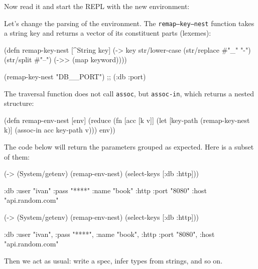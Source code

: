 
\noindent
Now read it and start the REPL with the new environment:


Let's change the parsing of the environment. The \texttt{remap--key--nest} function takes a string key and returns a vector of its constituent parts (lexemes):

\begin{clojure}
(defn remap-key-nest
  [^String key]
  (-> key
      str/lower-case
      (str/replace #"_" "-")
      (str/split #"--")
      (->> (map keyword))))

(remap-key-nest "DB__PORT")
;; (:db :port)
\end{clojure}


\noindent
The traversal function does not call \verb|assoc|, but \verb|assoc-in|, which returns a nested structure:

\begin{clojure}
(defn remap-env-nest
  [env]
  (reduce
   (fn [acc [k v]]
     (let [key-path (remap-key-nest k)]
       (assoc-in acc key-path v)))
   {}
   env))
\end{clojure}

The code below will return the parameters grouped as expected. Here is a subset of them:

\ifnarrow

\begin{clojure}
(-> (System/getenv)
    (remap-env-nest)
    (select-keys [:db :http]))

{:db {:user "ivan"
      :pass "****"
      :name "book"}
 :http {:port "8080"
        :host "api.random.com"}}
\end{clojure}

\else

\begin{clojure}
(-> (System/getenv)
    (remap-env-nest)
    (select-keys [:db :http]))

{:db {:user "ivan", :pass "****", :name "book"},
 :http {:port "8080", :host "api.random.com"}}
\end{clojure}

\fi

\noindent
Then we act as usual: write a spec, infer types from strings, and so on.

